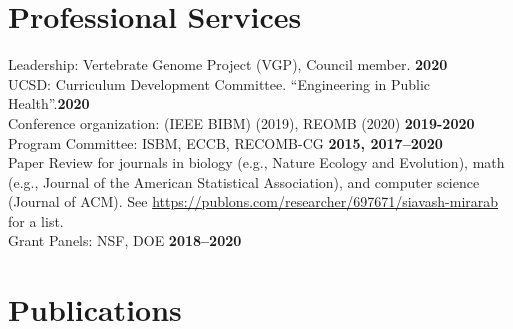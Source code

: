 \documentclass[margin,line,letterpaper]{resume}
\begin{document}
\begin{resume}
    \section{\mysidestyle Professional Services}
    Leadership: Vertebrate Genome Project (VGP), Council member.   \hfill \textbf{2020}\vspace{1mm}\\
    UCSD: Curriculum Development Committee. ``Engineering in Public Health''.\hfill \textbf{2020}\vspace{1mm} \\
     Conference organization: (IEEE BIBM) (2019), REOMB (2020)   \hfill \textbf{2019-2020}\vspace{1mm}\\
    Program Committee: ISBM, ECCB, RECOMB-CG  \hfill \textbf{2015, 2017--2020}\vspace{1mm}\\
    Paper Review for journals in biology (e.g.,  Nature Ecology and Evolution), math (e.g., Journal of the American Statistical Association), and computer science (Journal of ACM). See \url{https://publons.com/researcher/697671/siavash-mirarab} for a list.\\
Grant Panels:  NSF, DOE  \hfill \textbf{2018--2020}








    \renewcommand*{\thefootnote}{\fnsymbol{footnote}}
    \section{\mysidestyle Publications}


\end{resume}
\end{document}
